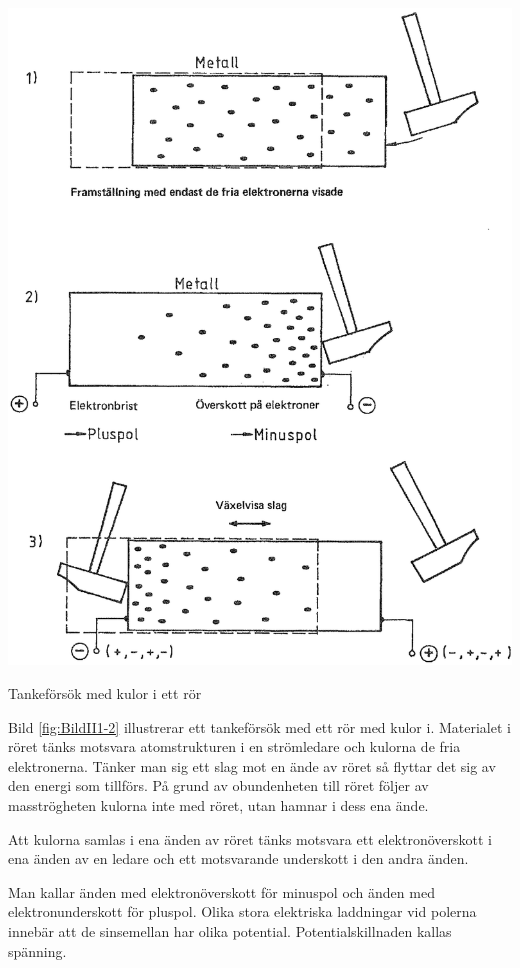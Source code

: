 \begin{marginfigure}
\includegraphics{images/cropped_pdfs/bild_2_1-02.pdf}
\caption{Tankeförsök med kulor i ett rör}
\label{fig:BildII1-2}
\end{marginfigure}

Bild \ref{fig:BildII1-2} illustrerar ett tankeförsök med ett rör med kulor i. Materialet i röret tänks motsvara atomstrukturen i en strömledare och kulorna
de fria elektronerna.
Tänker man sig ett slag mot en ände av röret så flyttar det sig av den energi
som tillförs.
På grund av obundenheten till röret följer av masströgheten kulorna inte med
röret, utan hamnar i dess ena ände.

Att kulorna samlas i ena änden av röret tänks motsvara ett elektronöverskott i
ena änden av en ledare och ett motsvarande underskott i den andra änden.

Man kallar änden med elektronöverskott för minuspol och änden med
elektronunderskott för pluspol.
Olika stora elektriska laddningar vid polerna innebär att de sinsemellan har
olika potential.
Potentialskillnaden kallas spänning.

